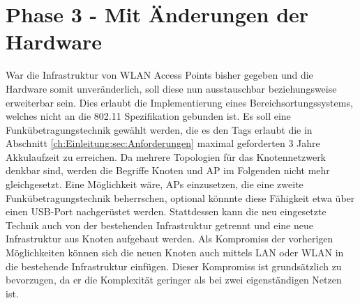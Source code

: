 \chapter{Phase 3 - Mit Änderungen der Hardware}
\label{ch:phase3}
War die Infrastruktur von WLAN Access Points bisher gegeben und die Hardware somit unveränderlich, soll diese nun ausstauschbar beziehungsweise erweiterbar sein.
Dies erlaubt die Implementierung eines Bereichsortungssystems, welches nicht an die 802.11 Spezifikation gebunden ist.
Es soll eine Funkübetragungstechnik gewählt werden, die es den Tags erlaubt die in Abschnitt \ref{ch:Einleitung:sec:Anforderungen} maximal geforderten 3 Jahre Akkulaufzeit zu erreichen.
Da mehrere Topologien für das Knotennetzwerk denkbar sind, werden die Begriffe Knoten und AP im Folgenden nicht mehr gleichgesetzt.
Eine Möglichkeit wäre, APs einzusetzen, die eine zweite Funkübetragungstechnik beherrschen, optional könnnte diese Fähigkeit etwa über einen USB-Port nachgerüstet werden.
Stattdessen kann die neu eingesetzte Technik auch von der bestehenden Infrastruktur getrennt und eine neue Infrastruktur aus Knoten aufgebaut werden.
Als Kompromiss der vorherigen Möglichkeiten können sich die neuen Knoten auch mittels LAN oder WLAN in die bestehende Infrastruktur einfügen. 
Dieser Kompromiss ist grundsätzlich zu bevorzugen, da er die Komplexität geringer als bei zwei eigenständigen Netzen ist.

